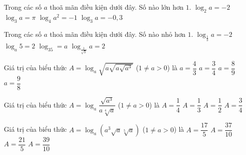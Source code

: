 \begin{ex}%
	Trong các số $a$ thoã mãn điều kiện dưới đây. Số nào lớn hơn $1$. 
	\choice
	{$\log_2a=-2$}
	{\True $\log_3a=\pi$}
	{$\log_4a^2=-1$}
	{$\log_3a=-0,3$}
\end{ex}

\begin{ex}%
	Trong các số $a$ thoả mãn điều kiện dưới đây. Số nào nhỏ hơn $1$. 
	\choice
	{$\log_{\tfrac{1}{3}}a=-2$}
	{$\log_a5=2$}
	{$\log_35=a$}
	{\True $\log_{\tfrac{1}{\sqrt{3}}}a=2$}
\end{ex}

\begin{ex}%
	Giá trị của biểu thức $A=\log_a\sqrt{a\sqrt{a\sqrt{a^3}}}$ ($1\neq a>0$) là
	\choice
	{$a=\dfrac{4}{3}$}
	{$a=\dfrac{3}{4}$}
	{$a=\dfrac{8}{9}$}
	{\True $a=\dfrac{9}{8}$}
\end{ex}

\begin{ex}%
	Giá trị của biểu thức $A=\log_a\dfrac{\sqrt{a^3}}{a\sqrt[4]{a}}$ ($1\neq a>0$) là 
	\choice
	{\True $A=\dfrac{1}{4}$}
	{$A=\dfrac{1}{3}$}
	{$A=\dfrac{1}{2}$}
	{$A=\dfrac{3}{4}$}
\end{ex}

\begin{ex}%
	Giá trị của biểu thức $A=\log_a\left(a^3\sqrt{a}\sqrt[5]{a}\right)$ ($1\neq a>0$) là 
	\choice
	{$A=\dfrac{17}{5}$}
	{\True $A=\dfrac{37}{10}$}
	{$A=\dfrac{21}{5}$}
	{$A=\dfrac{39}{10}$}
\end{ex}

